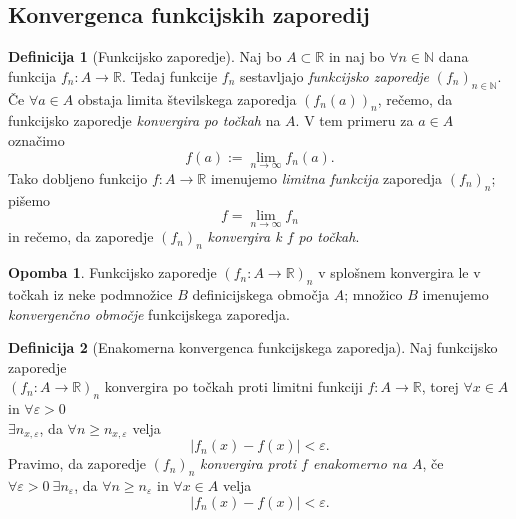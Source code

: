 \documentclass[11pt]{article}
\theoremstyle{definition}
\newtheorem{definicija}{Definicija}[section]
\theoremstyle{definition}
\theoremstyle{definition}
\theoremstyle{theorem}
\newtheorem*{opomba}{Opomba}
\begin{document}
\subsection{Konvergenca funkcijskih zaporedij}
\vspace{0.5cm}

\begin{definicija}[Funkcijsko zaporedje]

Naj bo $A \subset \mathbb{R}$ in naj bo $\forall n \in \mathbb{N}$ dana funkcija $f_n: A \rightarrow \mathbb{R}$. Tedaj funkcije $f_n$ sestavljajo \textit{funkcijsko zaporedje} $(f_n)_{n \in \mathbb{N}}$. \\

Če $\forall a \in A$ obstaja limita številskega zaporedja $(f_n(a))_n$, rečemo, da funkcijsko zaporedje \textit{konvergira po točkah} na $A$. V tem primeru za $a \in A$ označimo 
$$f(a) := \lim_{n \rightarrow \infty} f_n(a).$$
Tako dobljeno funkcijo $f: A \rightarrow \mathbb{R}$ imenujemo \textit{limitna funkcija} zaporedja $(f_n)_n$; pišemo 
$$f = \lim_{n \rightarrow \infty} f_n$$
in rečemo, da zaporedje $(f_n)_n$ \textit{konvergira k $f$ po točkah}.

\end{definicija}
\vspace{0.5cm}

\begin{opomba}

Funkcijsko zaporedje $(f_n: A \rightarrow \mathbb{R})_n$ v splošnem konvergira le v točkah iz neke podmnožice $B$ definicijskega območja $A$; množico $B$ imenujemo \textit{konvergenčno območje} funkcijskega zaporedja.

\end{opomba}
\vspace{0.5cm}

\begin{definicija}[Enakomerna konvergenca funkcijskega zaporedja]

Naj funkcijsko zaporedje \\ $(f_n: A \rightarrow \mathbb{R})_n$ konvergira po točkah proti limitni funkciji $f: A \rightarrow \mathbb{R}$, torej $\forall x \in A$ in $\forall \varepsilon > 0$ \\ $\exists n_{x,\varepsilon}$, da $\forall n \geq n_{x,\varepsilon}$ velja 
$$|f_n(x) - f(x)| < \varepsilon.$$
Pravimo, da zaporedje $(f_n)_n$ \textit{konvergira proti $f$ enakomerno na $A$}, če $\forall  \varepsilon > 0 ~\exists n_{\varepsilon}$, da $\forall n \geq n_{\varepsilon}$ in $\forall x \in A$ velja
$$|f_n(x) - f(x)| < \varepsilon.$$

\end{definicija}
\vspace{0.5cm}
\end{document}
